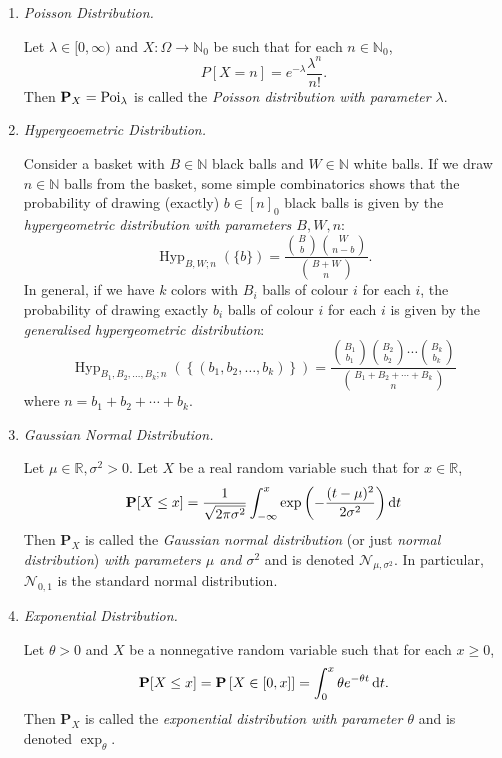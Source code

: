 \begin{enumerate}
    \item \textit{Poisson Distribution.}
    
    Let $\lambda\in[0,\infty)$ and $X:\Omega\to\mathbb{N}_0$ be such that for each $n\in\mathbb{N}_0$,
    $$P[X=n]=e^{-\lambda}\frac{\lambda^n}{n!}.$$
    Then $\textbf{P}_X=\operatorname{Poi}_\lambda$ is called the \textit{Poisson distribution with parameter $\lambda$}.
    
    \item \textit{Hypergeoemetric Distribution.}
    
    Consider a basket with $B\in\mathbb{N}$ black balls and $W\in\mathbb{N}$ white balls. If we draw $n\in\mathbb{N}$ balls from the basket, some simple combinatorics shows that the probability of drawing (exactly) $b\in[n]_0$ black balls is given by the \textit{hypergeometric distribution with parameters $B,W,n$}:
    $$\operatorname{Hyp}_{B,W;n}(\{b\})=\frac{\binom{B}{b}\binom{W}{n-b}}{\binom{B+W}{n}}.$$
    In general, if we have $k$ colors with $B_i$ balls of colour $i$ for each $i$, the probability of drawing exactly $b_i$ balls of colour $i$ for each $i$ is given by the \textit{generalised hypergeometric distribution}:
    $$\operatorname{Hyp}_{B_1,B_2,\ldots,B_k;n}(\left\{(b_1,b_2,\ldots,b_k)\right\}) = \frac{\binom{B_1}{b_1}\binom{B_2}{b_2}\cdots\binom{B_k}{b_k}}{\binom{B_1+B_2+\cdots+B_k}{n}}$$
    where $n=b_1+b_2+\cdots+b_k$.
    
    \item \textit{Gaussian Normal Distribution.}
    
    Let $\mu\in\mathbb{R}, \sigma^2>0$. Let $X$ be a real random variable such that for $x\in\mathbb{R}$,
    $$\textbf{P}[X\leq x]=\frac{1}{\sqrt{2\pi\sigma^2}}\int_{-\infty}^x \exp\left(-\frac{(t-\mu)^2}{2\sigma^2}\right)\operatorname{d}\!{t}$$
    Then $\textbf{P}_X$ is called the \textit{Gaussian normal distribution} (or just \textit{normal distribution}) \textit{with parameters $\mu$ and $\sigma^2$} and is denoted $\mathcal{N}_{\mu,\sigma^2}$. In particular, $\mathcal{N}_{0,1}$ is the standard normal distribution. 
    
    \item \textit{Exponential Distribution.}
    
    Let $\theta>0$ and $X$ be a nonnegative random variable such that for each $x\geq 0$,
    $$\textbf{P}[X\leq x]=\textbf{P}\left[X\in[0,x]\right]=\int_{0}^x\theta e^{-\theta t}\operatorname{d}\!{t}.$$
    Then $\textbf{P}_X$ is called the \textit{exponential distribution with parameter $\theta$} and is denoted $\exp_\theta$.
    

\end{enumerate}
